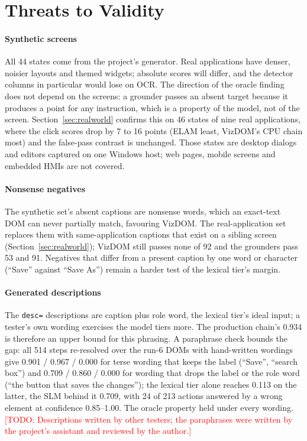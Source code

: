 \documentclass[conference]{IEEEtran}
\newcommand{\code}[1]{\texttt{#1}}
\newcommand{\todo}[1]{\textcolor{red}{[TODO: #1]}}
\begin{document}
\section{Threats to Validity}
\label{sec:threats}
\paragraph{Synthetic screens} All 44 states come from the project's generator. Real applications have denser, noisier layouts and themed widgets; absolute scores will differ, and the detector columns in particular would lose on OCR. The direction of the oracle finding does not depend on the screens: a grounder passes an absent target because it produces a point for any instruction, which is a property of the model, not of the screen. Section~\ref{sec:realworld} confirms this on 46 states of nine real applications, where the click scores drop by 7 to 16 points (ELAM least, VizDOM's CPU chain most) and the false-pass contrast is unchanged. Those states are desktop dialogs and editors captured on one Windows host; web pages, mobile screens and embedded HMIs are not covered.

\paragraph{Nonsense negatives} The synthetic set's absent captions are nonsense words, which an exact-text DOM can never partially match, favouring VizDOM. The real-application set replaces them with same-application captions that exist on a sibling screen (Section~\ref{sec:realworld}); VizDOM still passes none of 92 and the grounders pass 53 and 91. Negatives that differ from a present caption by one word or character (``Save'' against ``Save As'') remain a harder test of the lexical tier's margin.

\paragraph{Generated descriptions} The \code{desc=} descriptions are caption plus role word, the lexical tier's ideal input; a tester's own wording exercises the model tiers more. The production chain's 0.934 is therefore an upper bound for this phrasing. A paraphrase check bounds the gap: all 514 steps re-resolved over the run-6 DOMs with hand-written wordings give 0.901 / 0.967 / 0.000 for terse wording that keeps the label (``Save'', ``search box'') and 0.709 / 0.860 / 0.000 for wording that drops the label or the role word (``the button that saves the changes''); the lexical tier alone reaches 0.113 on the latter, the SLM behind it 0.709, with 24 of 213 actions answered by a wrong element at confidence 0.85--1.00. The oracle property held under every wording. \todo{Descriptions written by other testers; the paraphrases were written by the project's assistant and reviewed by the author.}
\end{document}

